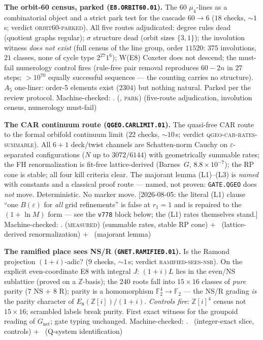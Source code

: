 \documentclass[11pt,a4paper]{article}
\newcommand{\Z}{\mathbb{Z}}
\theoremstyle{definition}
\begin{document}
\par\smallskip\noindent\textbf{The orbit-60 census, parked
(\texttt{E8.ORBIT60.01}).}
The $60$ $\mu_4$-lines as a combinatorial object and a strict park
test for the cascade $60\to6$ ($18$ checks, ${\sim}1$\,s; verdict
\textsc{orbit60-parked}).  All five routes adjudicated: degree rules
dead (quotient graphs regular); $\sigma$ structure dead (orbit sizes
$\{3,1\}$); the involution witness \emph{does not exist} (full
census of the line group, order $11520$: $375$ involutions, $21$
classes, none of cycle type $2^{27}1^6$); W(E8) Coxeter does not
descend; the must-fail numerology control fires (rule-free pair
removal reproduces $60-2n$ in $27$ steps; $>10^{70}$ equally
successful sequences --- the counting carries no structure).  $A_5$
one-liner: order-5 elements exist ($2304$) but nothing natural.
Parked per the review protocol.
Machine-checked: .
(\mE, \textsc{park}) (five-route adjudication, involution census,
numerology must-fail)
\par\smallskip

\par\smallskip\noindent\textbf{The CAR continuum route
(\texttt{QGEO.CARLIMIT.01}).}
The quasi-free CAR route to the formal orbifold continuum limit
($22$ checks, ${\sim}10$\,s; verdict
\textsc{qgeo-car-rates-summable}).  All $6{+}1$ deck/twist channels
are Schatten-norm Cauchy on $\varepsilon$-separated configurations
($N$ up to $3072/6144$) with geometrically summable rates; the FH
renormalization is fit-free lattice-derived (Barnes~$G$,
$8.8\times10^{-7}$); the RP cone is stable; all four kill criteria
clear.  The majorant lemma (L1)--(L3) is \emph{named} with constants
and a classical proof route --- named, not proven:
\texttt{GATE.QGEO} does \emph{not} move.  Deterministic.  No marker
move.  [2026-08-05: the literal (L1) clause ``one $B(\varepsilon)$
for \emph{all} grid refinements'' is false at $r_1=1$ and is
repaired to the $(1+\ln M)$ form --- see the \texttt{v778} block
below; the (L1) rates themselves stand.]
Machine-checked: .
(\textsc{measured}) (summable rates, stable RP cone) $+$ \mE\
(lattice-derived renormalization) $+$ \mO\ (majorant lemma)
\par\smallskip

\par\smallskip\noindent\textbf{The ramified place sees NS/R
(\texttt{GNET.RAMIFIED.01}).}
Is the Ramond projection $(1{+}i)$-adic? ($9$ checks, ${\sim}1$\,s;
verdict \textsc{ramified-sees-nsr}).  On the explicit
even-coordinate E8 with integral $J$: $(1{+}i)L$ lies in the even/NS
sublattice (proved on a $\Z$-basis); the $240$ roots fall into
$15\times16$ classes of \emph{pure} parity ($7$ NS $+$ $8$ R);
parity is a homomorphism $\mathbb F_2^4\to\mathbb F_2$ --- the NS/R
grading \emph{is} the parity character of $E_8(\Z[i])/(1{+}i)$.
\emph{Controls fire}: $\Z[i]^4$ census not $15\times16$; scrambled
labels break purity.  First exact witness for the groupoid reading
of $G_{\mathrm{net}}$; gate typing unchanged.
Machine-checked: .
\mE\ (integer-exact slice, controls) $+$ \mO\ (Q-system
identification)
\par\smallskip
\end{document}
